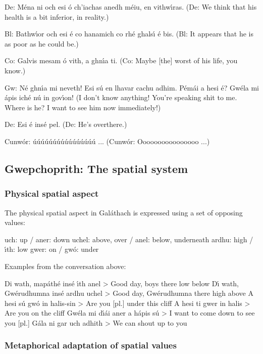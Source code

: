 De: M\'{e}na ni och esi \'{o} ch’iachas anedh m\'{e}iu, en vithw\'{\i}ras.
(De: We think that his health is a bit inferior, in reality.)

Bl: Bathw\'{\i}or och esi \'{e} co hanamich co rh\'{e} ghals\'{\i} \'{e} bis.
(Bl: It appears that he is as poor as he could be.)

Co: Galvis mesam \'{o} vith, a ghn\'{\i}a ti.
(Co: Maybe [the] worst of his life, you know.)

Gw: N\'{e} ghn\'{\i}a mi neveth! Esi s\'{u} en lhavar cachu adhim. P\'{e}m\'{a}i a hesi \'{e}? Gw\'{e}la mi \'{a}pis ich\'{e} n\'{u} in gov\'{\i}on!
(I don't know anything! You’re speaking shit to me. Where is he? I want to see him now immediately!)

De: Esi \'{e} ins\'{e} pel.
(De: He's overthere.)

Cunw\'{o}r: \'{u}\'{u}\'{u}\'{u}\'{u}\'{u}\'{u}\'{u}\'{u}\'{u}\'{u}\'{u}\'{u}\'{u}\'{u}\'{u} ...
(Cunw\'{o}r: Oooooooooooooooo ...)


\subsection{Gwepchoprith: The spatial system}
\subsubsection{Physical spatial aspect}

The physical spatial aspect in Gal\'{a}thach is expressed using a set of opposing values:

        uch: up                     / aner: down
        uchel: above, over    / anel: below, underneath
        ardhu: high              / \'{\i}th: low
        gwer: on                    / gw\'{o}: under

Examples from the conversation above:

Di wath, map\'{a}th\'{e} ins\'{e} \'{\i}th anel > Good day, boys there low below
D\'{\i} wath, Gw\'{e}rudhumna ins\'{e} ardhu uchel > Good day, Gw\'{e}rudhumna there high above 
A hesi s\'{u} gw\'{o} in halis-sin > Are you [pl.] under this cliff
A hesi ti gwer in halis > Are you on the cliff
Gw\'{e}la mi d\'{\i}\'{a}i aner a h\'{a}pis s\'{u} > I want to come down to see you [pl.]
G\'{a}la ni gar uch adhith > We can shout up to you


\subsubsection{Metaphorical adaptation of spatial values}

